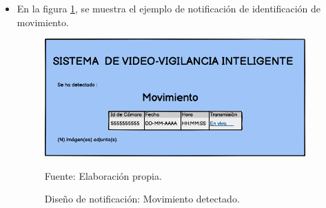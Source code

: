 \begin{itemize}
    \item En la figura \ref{fig:desing_motion_detection_notif}, se muestra el ejemplo de notificación de identificación de movimiento.
    \begin{figure}[H]
        \begin{center}
            \includegraphics[width=10cm]{img/capitulo_4/movement_detection_mail.png}
        \end{center}
        \begin{center}
            \caption{Diseño de notificación: Movimiento detectado.}
            Fuente: Elaboración propia.
            \label{fig:desing_motion_detection_notif}
        \end{center}
    \end{figure}
\end{itemize}

